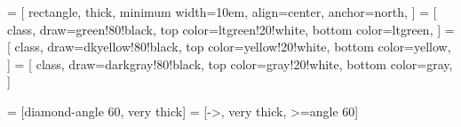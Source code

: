 \newcommand{\umlclass}[2]{\begin{minipage}{\maxof{\widthof{#1}+1em}{10em}}\parbox{\textwidth}{\centering #1}
\vspace*{-8pt} \hrule \vspace*{4pt} \parbox{\textwidth}{#2} \end{minipage}}
\newcommand{\umltype}[1]{$\ll$type$\gg$\\ #1}
\newcommand{\umlemptyclass}[1]{#1}

 = [
  rectangle,
  thick,
  minimum width=10em,
  align=center,
  anchor=north,
]
 = [
  class,
  draw=green!80!black,
  top color=ltgreen!20!white,
  bottom color=ltgreen,
]
 = [
  class,
  draw=dkyellow!80!black,
  top color=yellow!20!white,
  bottom color=yellow,
]
 = [
  class,
  draw=darkgray!80!black,
  top color=gray!20!white,
  bottom color=gray,
]

 = [diamond-angle 60, very thick]
 = [->, very thick, >=angle 60]


